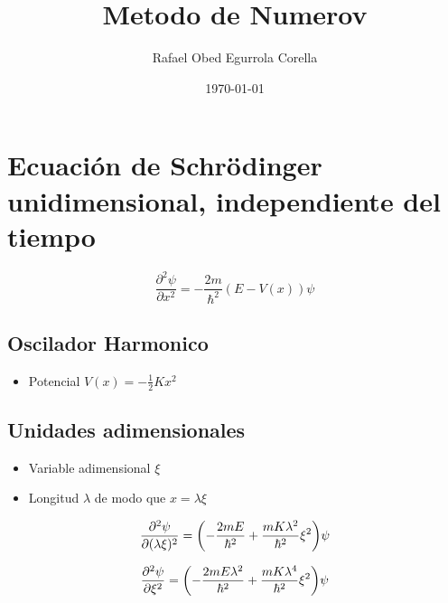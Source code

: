 \documentclass[11pt]{article}
\author{Rafael Obed Egurrola Corella}
\date{\today}
\title{Metodo de Numerov}
\begin{document}
\maketitle
\tableofcontents

\section{Ecuación de Schrödinger unidimensional, independiente del tiempo}
\label{sec:org3831300}

\[ \frac{\partial^{2}\psi}{\partial x^2} = - \frac{2m}{\hbar^2}(E - V(x))\psi \]
\subsection{Oscilador Harmonico}
\label{sec:orgae8bd12}

\begin{itemize}
\item Potencial \(V(x) = - \frac{1}{2}K x^2\)
\end{itemize}
\subsection{Unidades adimensionales}
\label{sec:org80be3a4}

\begin{itemize}
\item Variable adimensional \(\xi\)
\item Longitud \(\lambda\) de modo que \(x = \lambda \xi\)
\end{itemize}

\[ \pdv[2]{\psi}{(\lambda \xi)} = \qty( - \frac{2m E }{\hbar^2} + \frac{mK \lambda^2}{\hbar^2} \xi^2  )\psi \]

\[ \pdv[2]{\psi}{\xi} = \qty( - \frac{2m E \lambda^{2}}{\hbar^2} + \frac{mK \lambda^4}{\hbar^2} \xi^2  )\psi \]
\end{document}
